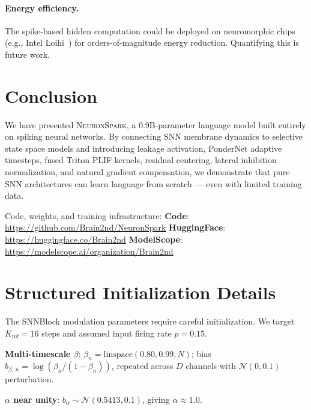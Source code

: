 \documentclass{article}
\newcommand{\model}{\textsc{NeuronSpark}}
\begin{document}
\paragraph{Energy efficiency.}
The spike-based hidden computation could be deployed on neuromorphic chips (e.g., Intel Loihi~\citep{davies2018loihi}) for orders-of-magnitude energy reduction. Quantifying this is future work.

\section{Conclusion}
\label{sec:conclusion}

We have presented \model{}, a 0.9B-parameter language model built entirely on spiking neural networks.
By connecting SNN membrane dynamics to selective state space models and introducing leakage activation, PonderNet adaptive timesteps, fused Triton PLIF kernels, residual centering, lateral inhibition normalization, and natural gradient compensation, we demonstrate that pure SNN architectures can learn language from scratch --- even with limited training data.

Code, weights, and training infrastructure:
\textbf{Code}: \url{https://github.com/Brain2nd/NeuronSpark} \quad
\textbf{HuggingFace}: \url{https://huggingface.co/Brain2nd} \quad
\textbf{ModelScope}: \url{https://modelscope.ai/organization/Brain2nd}




\appendix

\section{Structured Initialization Details}
\label{app:init}

The SNNBlock modulation parameters require careful initialization.
We target $K_{\text{ref}} = 16$ steps and assumed input firing rate $p = 0.15$.

\textbf{Multi-timescale $\beta$}: $\beta_n = \text{linspace}(0.80, 0.99, N)$; bias $b_{\beta,\,n} = \log(\beta_n / (1 - \beta_n))$, repeated across $D$ channels with $\mathcal{N}(0, 0.1)$ perturbation.

\textbf{$\alpha$ near unity}: $b_\alpha \sim \mathcal{N}(0.5413, 0.1)$, giving $\alpha \approx 1.0$.
\end{document}
